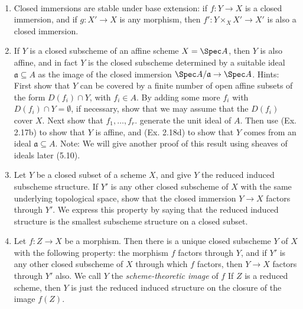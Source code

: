 \begin{exercise}[Closed Subschemes]%
	~
	\begin{enumerate}
		\item Closed immersions are stable under base extension: if $f: Y\to X$ is a closed immersion, and if $g:X'\to X$ is any morphism, then $f':Y\times_X X' \to X'$ is also a closed immersion.
		\item If $Y $ is a closed subscheme of an affine scheme $X = \Spec A $, then $Y$ is also affine, and in fact $Y$ is the closed subscheme determined by a suitable ideal $\mathfrak{a} \subseteq A $ as the image of the closed immersion $\Spec A/\mathfrak{a} \to \Spec A$.
			\ifhint
				Hints: First show that $Y$ can be covered by a finite number of open affine subsets of the form $D(f_i) \cap Y$, with $f_i \in A $. By adding some more $f_i $ with $D(f_i) \cap Y = \emptyset$, if necessary, show that we may assume that the $D(f_i)$ cover $X$. Next show that $f_1, \ldots,f_r$. generate the unit ideal of $A$. Then use (Ex. 2.17b) to show that $Y$ is affine, and (Ex. 2.18d) to show that $Y$ comes from an ideal $\mathfrak{a} \subseteq A$.
			\fi
			Note: We will give another proof of this result using sheaves of ideals later (5.10).
		\item Let $Y $ be a closed subset of a scheme $X $, and give $Y $ the reduced induced subscheme structure. If $Y'$ is any other closed subscheme of $X$ with the same underlying topological space, show that the closed immersion $Y \to X$ factors through $Y'$. We express this property by saying that the reduced induced structure is the smallest subscheme structure on a closed subset.
		\item Let $f:Z \to X$ be a morphism. Then there is a unique closed subscheme $Y$ of $X$ with the following property: the morphism $f$ factors through $Y$, and if $Y'$ is any other closed subscheme of $X$ through which $f$ factors, then $Y \to X$ factors through $Y'$ also. We call $Y$ the \textit{scheme-theoretic image} of $f$ If $Z$ is a reduced scheme, then $Y$ is just the reduced induced structure on the closure of the image $f(Z)$.
	\end{enumerate}
\end{exercise}
